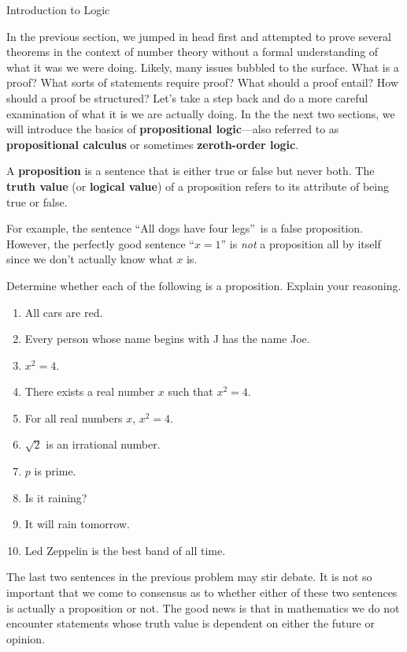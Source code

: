 \begin{section}{Introduction to Logic}\label{sec:Intro to Logic}

In the previous section, we jumped in head first and attempted to prove several theorems in the context of number theory without a formal understanding of what it was we were doing. Likely, many issues bubbled to the surface. What is a proof? What sorts of statements require proof? What should a proof entail?  How should a proof be structured? Let's take a step back and do a more careful examination of what it is we are actually doing. In the the next two sections, we will introduce the basics of \textbf{propositional logic}---also referred to as \textbf{propositional calculus} or sometimes \textbf{zeroth-order logic}.

\begin{definition}
A \textbf{proposition} is a sentence that is either true or false but never both. The \textbf{truth value} (or \textbf{logical value}) of a proposition refers to its attribute of being true or false.
\end{definition}

For example, the sentence ``All dogs have four legs''~is a false proposition.  However, the perfectly good sentence ``$x=1$'' is \emph{not} a proposition all by itself since we don't actually know what $x$ is.

\begin{problem} Determine whether each of the following is a proposition. Explain your reasoning.
\begin{enumerate}[label=\textrm{(\alph*)}]
\item All cars are red.
\item Every person whose name begins with J has the name Joe.
\item $x^2=4$.
\item There exists a real number $x$ such that $x^2=4$.
\item For all real numbers $x$, $x^2=4$.
\item $\sqrt{2}$ is an irrational number.
\item $p$ is prime.
\item Is it raining?
\item It will rain tomorrow.
\item Led Zeppelin is the best band of all time.
\end{enumerate}
\end{problem}

The last two sentences in the previous problem may stir debate. It is not so important that we come to consensus as to whether either of these two sentences is actually a proposition or not. The good news is that in mathematics we do not encounter statements whose truth value is dependent on either the future or opinion.


\end{section}
